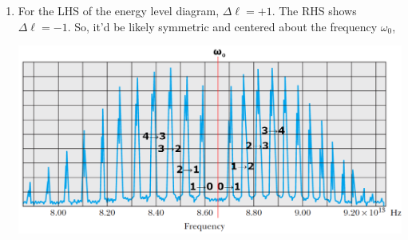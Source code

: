 \documentclass{homework}
\begin{document}
\begin{enumerate}[label={\arabic*.}]
		\item For the LHS of the energy level diagram, $\Delta \ell = +1$. The RHS shows $\Delta \ell = -1$. So, it'd be likely symmetric and centered about the frequency $\omega_0$,

		\begin{center}
			\includegraphics[width=\linewidth]{screenshot001}
		\end{center}
		
	\end{enumerate}
\end{document}
